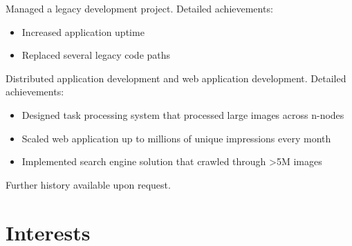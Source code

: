 \documentclass[11pt,a4paper,sans]{moderncv}   %
\begin{document}
{Managed a legacy development project.\newline{}%
Detailed achievements:%
\begin{itemize}%
\item Increased application uptime
\item Replaced several legacy code paths
\end{itemize}}
{Distributed application development and web application development.\newline{}%
Detailed achievements:%
\begin{itemize}%
\item Designed task processing system that processed large images across
  n-nodes
\item Scaled web application up to millions of unique impressions
  every month
\item Implemented search engine solution that crawled through >5M
  images
\end{itemize}}
{Further history available upon request.}

\section{Interests}



%
\end{document}
